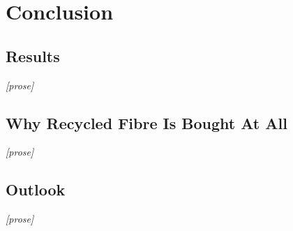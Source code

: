 \section{Conclusion}

\subsection{Results}
\textit{[prose]}

\subsection{Why Recycled Fibre Is Bought At All}
\textit{[prose]}

\subsection{Outlook}
\textit{[prose]}
